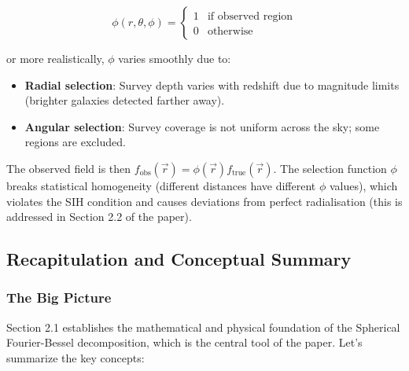 \begin{equation}
\phi(r, \theta, \phi) = \begin{cases}
1 & \text{if observed region} \\
0 & \text{otherwise}
\end{cases}
\end{equation}

or more realistically, $\phi$ varies smoothly due to:
\begin{itemize}
    \item \textbf{Radial selection}: Survey depth varies with redshift due to magnitude limits (brighter galaxies detected farther away).
    \item \textbf{Angular selection}: Survey coverage is not uniform across the sky; some regions are excluded.
\end{itemize}

The observed field is then $f_{\text{obs}}(\vec{r}) = \phi(\vec{r}) f_{\text{true}}(\vec{r})$. The selection function $\phi$ breaks statistical homogeneity (different distances have different $\phi$ values), which violates the SIH condition and causes deviations from perfect radialisation (this is addressed in Section 2.2 of the paper).

\subsection{Recapitulation and Conceptual Summary}

\subsubsection{The Big Picture}

Section 2.1 establishes the mathematical and physical foundation of the Spherical Fourier-Bessel decomposition, which is the central tool of the paper. Let's summarize the key concepts:

